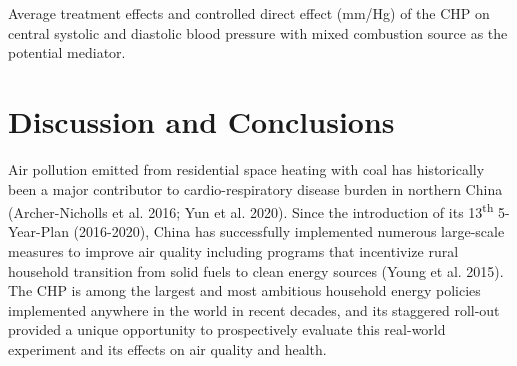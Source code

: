 \documentclass[
  letterpaper,
  DIV=11,
  numbers=noendperiod]{scrartcl}
\makeatletter
\renewenvironment{table}%
   {\renewcommand\familydefault\sfdefault
    \@float{table}}
   {\end@float}
\makeatother
\begin{document}
\begin{table}

\caption{\label{tbl-med-source}Average treatment effects and controlled
direct effect (mm/Hg) of the CHP on central systolic and diastolic blood
pressure with mixed combustion source as the potential mediator.}


\end{table}%

\section{Discussion and Conclusions}\label{discussion-and-conclusions}

Air pollution emitted from residential space heating with coal has
historically been a major contributor to cardio-respiratory disease
burden in northern China (Archer-Nicholls et al. 2016; Yun et al. 2020).
Since the introduction of its 13\textsuperscript{th} 5-Year-Plan
(2016-2020), China has successfully implemented numerous large-scale
measures to improve air quality including programs that incentivize
rural household transition from solid fuels to clean energy sources
(Young et al. 2015). The CHP is among the largest and most ambitious
household energy policies implemented anywhere in the world in recent
decades, and its staggered roll-out provided a unique opportunity to
prospectively evaluate this real-world experiment and its effects on air
quality and health.
\end{document}
